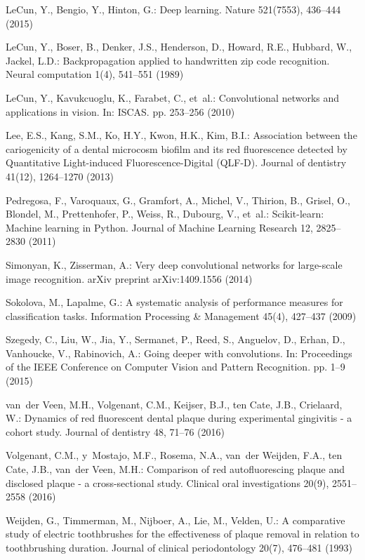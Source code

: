 \documentclass[runningheads,a4paper]{llncs}
\begin{document}
\begin{thebibliography}{10}
LeCun, Y., Bengio, Y., Hinton, G.: Deep learning. Nature  521(7553),  436--444
  (2015)

LeCun, Y., Boser, B., Denker, J.S., Henderson, D., Howard, R.E., Hubbard, W.,
  Jackel, L.D.: Backpropagation applied to handwritten zip code recognition.
  Neural computation  1(4),  541--551 (1989)

LeCun, Y., Kavukcuoglu, K., Farabet, C., et~al.: Convolutional networks and
  applications in vision. In: ISCAS. pp. 253--256 (2010)

Lee, E.S., Kang, S.M., Ko, H.Y., Kwon, H.K., Kim, B.I.: Association between the
  cariogenicity of a dental microcosm biofilm and its red fluorescence detected
  by {Q}uantitative {L}ight-induced {F}luorescence-{D}igital ({QLF-D}). Journal
  of dentistry  41(12),  1264--1270 (2013)

Pedregosa, F., Varoquaux, G., Gramfort, A., Michel, V., Thirion, B., Grisel,
  O., Blondel, M., Prettenhofer, P., Weiss, R., Dubourg, V., et~al.:
  Scikit-learn: Machine learning in {P}ython. Journal of Machine Learning
  Research  12,  2825--2830 (2011)

Simonyan, K., Zisserman, A.: Very deep convolutional networks for large-scale
  image recognition. arXiv preprint arXiv:1409.1556  (2014)

Sokolova, M., Lapalme, G.: A systematic analysis of performance measures for
  classification tasks. Information Processing \& Management  45(4),  427--437
  (2009)

Szegedy, C., Liu, W., Jia, Y., Sermanet, P., Reed, S., Anguelov, D., Erhan, D.,
  Vanhoucke, V., Rabinovich, A.: Going deeper with convolutions. In:
  Proceedings of the IEEE Conference on Computer Vision and Pattern
  Recognition. pp. 1--9 (2015)

van~der Veen, M.H., Volgenant, C.M., Keijser, B.J., ten Cate, J.B., Crielaard,
  W.: Dynamics of red fluorescent dental plaque during experimental gingivitis
  - a cohort study. Journal of dentistry  48,  71--76 (2016)

Volgenant, C.M., y~Mostajo, M.F., Rosema, N.A., van~der Weijden, F.A., ten
  Cate, J.B., van~der Veen, M.H.: Comparison of red autofluorescing plaque and
  disclosed plaque - a cross-sectional study. Clinical oral investigations
  20(9),  2551--2558 (2016)

Weijden, G., Timmerman, M., Nijboer, A., Lie, M., Velden, U.: A comparative
  study of electric toothbrushes for the effectiveness of plaque removal in
  relation to toothbrushing duration. Journal of clinical periodontology
  20(7),  476--481 (1993)
\end{thebibliography}
\end{document}
